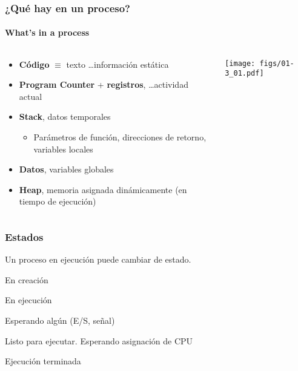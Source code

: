 \documentclass[letter]{beamer}
\begin{document}
\begin{frame}
  \frametitle{¿Qué hay en un proceso?}
  \framesubtitle{What's in a process}

  \begin{columns}[c]
    \begin{column}[T]{8.5cm}
      \begin{itemize}
        \item {\bf Código} $\equiv$ texto \ldots información estática
        \item {\bf Program Counter} + {\bf registros}, \ldots actividad actual
        \item {\bf Stack}, datos temporales
          \begin{itemize}
            \item Parámetros de función, direcciones de retorno, variables locales
          \end{itemize}
        \item {\bf Datos}, variables globales
        \item {\bf Heap}, memoria asignada dinámicamente (en tiempo de ejecución)
      \end{itemize}
    \end{column}
    
    \begin{column}[T]{3cm}
      \begin{center}
        \texttt{[image: figs/01-3\_01.pdf]}
      \end{center}
    \end{column}
  \end{columns}
\end{frame}

\begin{frame}
  \frametitle{Estados}

  Un proceso en ejecución puede cambiar de estado.
  
    \begin{description}
      \item<2->[New] En creación
      \item<3->[Running] En ejecución
      \item<4->[Waiting] Esperando algún (E/S, señal)
      \item<5->[Ready] Listo para ejecutar. Esperando asignación de CPU
      \item<6->[Terminated] Ejecución terminada
    \end{description}


\end{frame}
\end{document}
